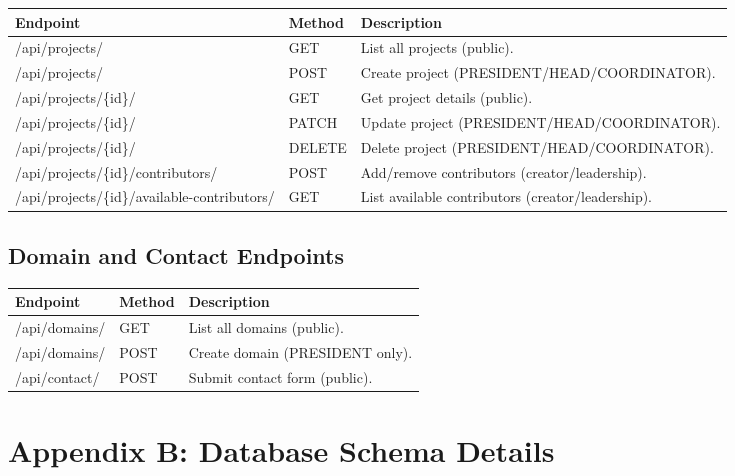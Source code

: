 \documentclass[11pt,a4paper]{article}
\begin{document}
\begin{tabular}{|p{5cm}|p{2cm}|p{7cm}|}
\hline
\textbf{Endpoint} & \textbf{Method} & \textbf{Description} \\
\hline
/api/projects/ & GET & List all projects (public). \\
\hline
/api/projects/ & POST & Create project (PRESIDENT/HEAD/COORDINATOR). \\
\hline
/api/projects/\{id\}/ & GET & Get project details (public). \\
\hline
/api/projects/\{id\}/ & PATCH & Update project (PRESIDENT/HEAD/COORDINATOR). \\
\hline
/api/projects/\{id\}/ & DELETE & Delete project (PRESIDENT/HEAD/COORDINATOR). \\
\hline
/api/projects/\{id\}/contributors/ & POST & Add/remove contributors (creator/leadership). \\
\hline
/api/projects/\{id\}/available-contributors/ & GET & List available contributors (creator/leadership). \\
\hline
\end{tabular}

\subsection{Domain and Contact Endpoints}

\begin{tabular}{|p{4cm}|p{2cm}|p{8cm}|}
\hline
\textbf{Endpoint} & \textbf{Method} & \textbf{Description} \\
\hline
/api/domains/ & GET & List all domains (public). \\
\hline
/api/domains/ & POST & Create domain (PRESIDENT only). \\
\hline
/api/contact/ & POST & Submit contact form (public). \\
\hline
\end{tabular}

\section{Appendix B: Database Schema Details}
\end{document}
